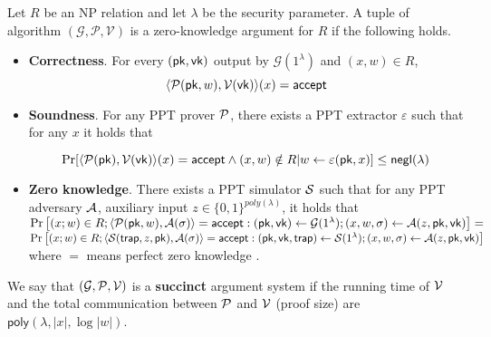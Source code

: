 \begin{definition}\label{def::zkp}
	
	Let $R$ be an NP relation and let $\lambda$ be the security parameter. A tuple of algorithm $(\mathcal{G}, \mathcal{P}, \mathcal{V})$ is a zero-knowledge argument for $R$ if the following holds.
	
	\begin{itemize}
		
		\item \textbf{Correctness}. For every $(\pk, \vk)$ output by $\mathcal{G}(1^\lambda)$ and $(x, w) \in R$, 
		$$\langle \P(\pk, w), \V(\vk) \rangle(x) = \accept$$
		\item \textbf{Soundness}. For any PPT prover $\P$, there exists a PPT extractor $\varepsilon$ such that for any $x$ it holds that
		
		$$\Pr[\langle\P(\pk), \V(\vk) \rangle(x) = \accept \wedge (x, w) \notin R | w \leftarrow \varepsilon(\pk, x)] \leq \neg(\lambda)$$
		\item \textbf{Zero knowledge}. There exists a PPT simulator $\S$ such that for any PPT adversary $\A$, auxiliary input $z \in \{0, 1\}^{poly(\lambda)}$, it holds that\\
		{\fontsize{8}{8}
		$\Pr\left[(x;w)\in R; \langle\P(\pk,w),\A(\sigma) \rangle=\accept: (\pk,\vk)\leftarrow\mathcal{G}(1^\lambda); (x,w,\sigma)\leftarrow\A(z,\pk,\vk) \right] = $\\
		$\Pr\left[(x;w)\in R; \langle\S(\mathsf{trap}, z, \pk),\A(\sigma) \rangle=\accept:(\pk,\vk,\mathsf{trap})\leftarrow\S(1^\lambda); (x,w,\sigma)\leftarrow\A(z,\pk,\vk)\right]$\\
		}
		where $=$ means perfect zero knowledge . 
		
	\end{itemize}
	We say that $(\mathcal{G},\P,\V)$ is a \textbf{succinct} argument system if the
	running time of $\V$ and the total communication between $\P$ and $\V$ (proof size) are $\mathsf{poly}(\lambda,|x|,\log|w|)$.
\end{definition}



